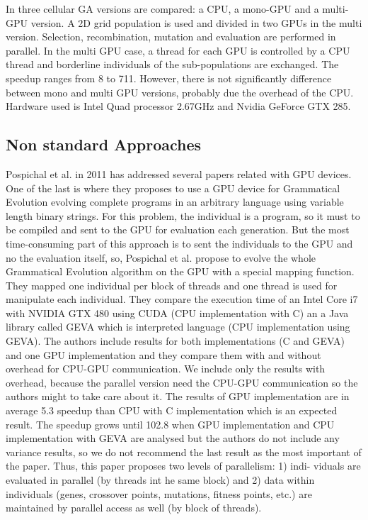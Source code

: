 \documentclass[prodmode,acmtecs]{acmsmall}
\begin{document}
In \cite{5586530} three cellular GA versions are compared: a CPU, a mono-GPU and a multi-GPU version. A 2D grid population is used and divided in two GPUs in the multi version. Selection, recombination, mutation and evaluation are performed in parallel. In the multi GPU case, a thread for each GPU is controlled by a CPU thread and borderline individuals of the sub-populations are exchanged. The
speedup ranges from 8 to 711. However, there is not significantly difference between mono and multi GPU versions, probably due the overhead of the CPU. Hardware used is Intel Quad processor 2.67GHz and Nvidia GeForce GTX 285.


\subsection{Non standard Approaches}

Pospichal et al. in 2011 has addressed several papers related with GPU devices. One of the last is \cite{DBLP:conf/gecco/PospichalMOSJ11} where they proposes to use a GPU device for Grammatical Evolution evolving complete programs in an arbitrary language using variable length binary strings. For this problem, the individual is a program, so it must to be compiled and sent to the GPU for evaluation each generation. But the most time-consuming part of this approach is to sent the individuals to the GPU and no the evaluation itself, so, Pospichal et al. propose to evolve the whole Grammatical Evolution algorithm on the GPU with a special mapping function. They mapped one individual per block of threads and one thread is used for manipulate each individual. They compare the execution time of an Intel Core i7 with NVIDIA GTX 480 using CUDA (CPU implementation with C) an a Java library called GEVA \cite{O'Neill:2008:GGE:1527063.1527066} which is interpreted language (CPU implementation using GEVA).  The authors include results for both implementations (C and GEVA) and one GPU implementation and they compare them with and without overhead for CPU-GPU communication. We include only the results with overhead, because the parallel version need the CPU-GPU communication so the authors might to take care about it. The results of GPU implementation are in average 5.3 speedup than CPU with C implementation which is an expected result. The speedup grows until 102.8 when GPU implementation and CPU implementation with GEVA are analysed but the authors do not include any variance results, so we do not recommend the last result as the most important of the paper. Thus, this paper proposes two levels of parallelism: 1) indi-
viduals are evaluated in parallel (by threads int he same block) and 2) data within individuals (genes, crossover points, mutations, fitness points, etc.) are maintained by parallel access as well (by block of threads).
\end{document}
